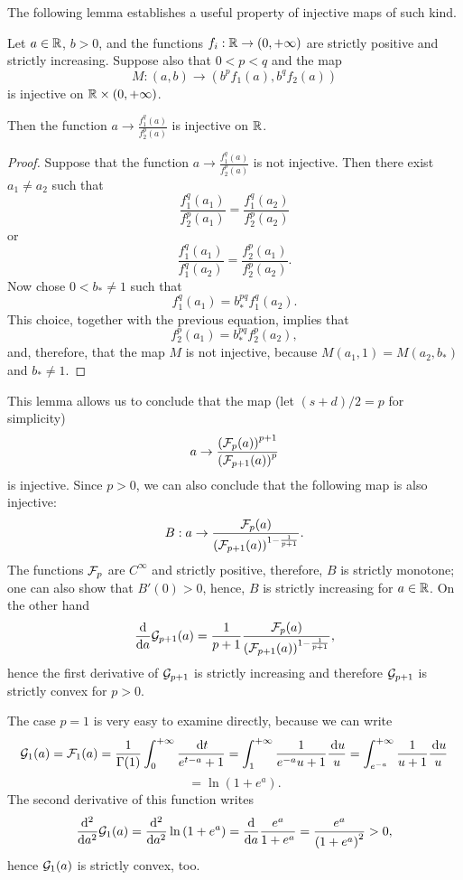 \documentclass[a4paper]{article}
\begin{document}
The following lemma establishes a useful property of injective maps of such kind.
\begin{lemma}
	Let $a\in{\mathbb R}$, $b>0$, and the functions $f_i:{\mathbb R}\to(0,+\infty)$ are strictly positive and strictly increasing. Suppose also that $0<p<q$ and the map
	\[
		M:(a,b)\to (b^pf_1(a),b^q f_2(a))
	\]
	is injective on ${\mathbb R}\times(0,+\infty)$.

	Then the function $a\to \frac{f_1^q(a)}{f_2^p(a)}$ is injective on ${\mathbb R}$.
	\label{le:inject}
\end{lemma}
\begin{proof}
	Suppose that the function $a\to \frac{f_1^q(a)}{f_2^p(a)}$ is not injective. Then there exist $a_1\ne a_2$ such that
	\[
		\frac{f_1^q(a_1)}{f_2^p(a_1)}=\frac{f_1^q(a_2)}{f_2^p(a_2)}
	\]
	or
	\[
		\frac{f_1^q(a_1)}{f_1^q(a_2)}=\frac{f_2^p(a_1)}{f_2^p(a_2)}.
	\]
	Now chose $0<b_*\ne1$ such that 
	\[
		f_1^q(a_1) = b_*^{pq}f_1^{q}(a_2).
	\]
	This choice, together with the previous equation, implies that
	\[
		f_2^p(a_1) = b_*^{pq}f_2^p(a_2),
	\]
	and, therefore, that the map $M$ is not injective, because $M(a_1,1)=M(a_2,b_*)$ and $b_*\ne 1$.
\end{proof}

This lemma allows us to conclude that the map (let $(s+d)/2=p$ for simplicity) 
\[
	a\to\frac{\left( \mathcal F_{p}(a) \right)^{p+1}}{\left( \mathcal F_{p+1}(a) \right)^{p}}
\]
is injective.
Since $p> 0$, we can also conclude that the following map is also injective:
\begin{equation}
	B:a\to\frac{\mathcal F_{p}(a)}{\left( \mathcal F_{p+1}(a) \right)^{1-\frac{1}{p+1}}}.
	\label{eq:poly:frac}
\end{equation}
The functions $\mathcal F_p$ are $C^{\infty}$ and strictly positive, therefore, $B$ is strictly monotone; one can also show that $B'(0)>0$, hence, $B$ is strictly increasing for $a\in{\mathbb R}$.
On the other hand
\[
	\frac{\mathrm d}{\mathrm da}\mathcal G_{p+1}(a)=\frac{1}{p+1}\frac{\mathcal F_p(a)}{\left( \mathcal F_{p+1}(a) \right)^{1-\frac{1}{p+1}}},
\]
hence the first derivative of $\mathcal G_{p+1}$ is strictly increasing and therefore $\mathcal G_{p+1}$ is strictly convex for $p>0$.

The case $p=1$ is very easy to examine directly, because we can write
\[
	\mathcal G_1(a)=\mathcal F_1(a) =\frac{1}{\Gamma(1)} \int_{0}^{+\infty}\frac{{\,\mathrm dt}}{e^{t-a}+1}=\int_{1}^{+\infty}\frac{1}{e^{-a}u+1}\frac{{\,\mathrm du}}{u}=\int_{e^{-a}}^{+\infty}\frac{1}{u+1}\frac{{\,\mathrm du}}{u}
\]
\[
	=\ln\left( 1+e^{a} \right).
\]
The second derivative of this function writes
\[
	\frac{\mathrm d^2}{\mathrm da^2}\mathcal G_{1}(a)=\frac{\mathrm d^2}{\mathrm da^2}\ln\left( 1+e^{a} \right)=\frac{\mathrm d}{\mathrm da}\frac{e^a}{1+e^a}=\frac{e^a}{\left( 1+e^a \right)^2}>0,
\]
hence $\mathcal G_1(a)$ is strictly convex, too.
\end{document}
